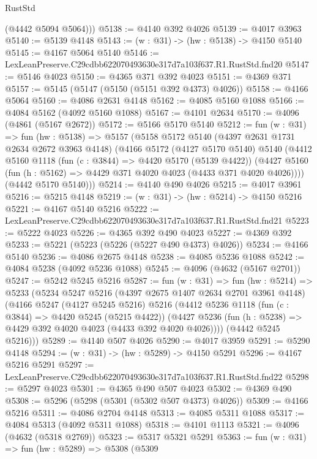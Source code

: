 \begin{lexlean}{RustStd}
\begin{coremodule}
        (@4442 @5094 @5064)))
@5138 := @4140 @392 @4026
@5139 := @4017 @3963
@5140 := @5139 @4148
@5143 := (w : @31) -> (hw : @5138) -> @4150 @5140
@5145 := @4167 @5064 @5140
@5146 := LexLeanPreserve.C29cdbb622070493630e317d7a103f637.R1.RustStd.fnd20
@5147 := @5146 @4023
@5150 := @4365 @371 @392 @4023
@5151 := @4369 @371
@5157 := @5145 (@5147 (@5150 (@5151 @392 @4373) @4026))
@5158 := @4166 @5064
@5160 := @4086 @2631 @4148
@5162 := @4085 @5160 @1088
@5166 := @4084 @5162 (@4092 @5160 @1088)
@5167 := @4101 @2634
@5170 := @4096 (@4861 (@5167 @2672))
@5172 := @5166 @5170 @5140
@5212 := fun (w : @31) =>
  fun (hw : @5138) =>
  @5157
    (@5158
      @5172
      @5140
      (@4397 @2631 @1731 @2634 @2672 @3963 @4148)
      (@4166
        @5172
        (@4127 @5170 @5140)
        @5140
        (@4412
          @5160
          @1118
          (fun (c : @3844) => @4420 @5170 (@5139 @4422))
          (@4427 @5160 (fun (h : @5162) => @4429 @371 @4020 @4023 (@4433 @371 @4020 @4026))))
        (@4442 @5170 @5140)))
@5214 := @4140 @490 @4026
@5215 := @4017 @3961
@5216 := @5215 @4148
@5219 := (w : @31) -> (hw : @5214) -> @4150 @5216
@5221 := @4167 @5140 @5216
@5222 := LexLeanPreserve.C29cdbb622070493630e317d7a103f637.R1.RustStd.fnd21
@5223 := @5222 @4023
@5226 := @4365 @392 @490 @4023
@5227 := @4369 @392
@5233 := @5221 (@5223 (@5226 (@5227 @490 @4373) @4026))
@5234 := @4166 @5140
@5236 := @4086 @2675 @4148
@5238 := @4085 @5236 @1088
@5242 := @4084 @5238 (@4092 @5236 @1088)
@5245 := @4096 (@4632 (@5167 @2701))
@5247 := @5242 @5245 @5216
@5287 := fun (w : @31) =>
  fun (hw : @5214) =>
  @5233
    (@5234
      @5247
      @5216
      (@4397 @2675 @1407 @2634 @2701 @3961 @4148)
      (@4166
        @5247
        (@4127 @5245 @5216)
        @5216
        (@4412
          @5236
          @1118
          (fun (c : @3844) => @4420 @5245 (@5215 @4422))
          (@4427 @5236 (fun (h : @5238) => @4429 @392 @4020 @4023 (@4433 @392 @4020 @4026))))
        (@4442 @5245 @5216)))
@5289 := @4140 @507 @4026
@5290 := @4017 @3959
@5291 := @5290 @4148
@5294 := (w : @31) -> (hw : @5289) -> @4150 @5291
@5296 := @4167 @5216 @5291
@5297 := LexLeanPreserve.C29cdbb622070493630e317d7a103f637.R1.RustStd.fnd22
@5298 := @5297 @4023
@5301 := @4365 @490 @507 @4023
@5302 := @4369 @490
@5308 := @5296 (@5298 (@5301 (@5302 @507 @4373) @4026))
@5309 := @4166 @5216
@5311 := @4086 @2704 @4148
@5313 := @4085 @5311 @1088
@5317 := @4084 @5313 (@4092 @5311 @1088)
@5318 := @4101 @1113
@5321 := @4096 (@4632 (@5318 @2769))
@5323 := @5317 @5321 @5291
@5363 := fun (w : @31) =>
  fun (hw : @5289) =>
  @5308
    (@5309

\end{coremodule}
\end{lexlean}
